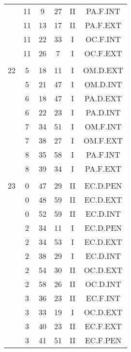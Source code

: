 \documentclass[12pt, a4paper]{article}
\begin{document}
\begin{multicols}{3}
{\begin{tabular}{c c c c c c}
	 	 	 	 & 11 & 9 & 27 & II & PA.F.INT\\%
	 	 	 	 & 11 & 13 & 17 & II & PA.F.EXT\\%
	 	 	 	 & 11 & 22 & 33 & I & OC.F.INT\\%
	 	 	 	 & 11 & 26 & 7 & I & OC.F.EXT\\%
	 	 	 	 & & & & & \\%
	 	 	 	22 & 5 & 18 & 11 & I & OM.D.EXT\\%
	 	 	 	 & 5 & 21 & 47 & I & OM.D.INT\\%
	 	 	 	 & 6 & 18 & 47 & I & PA.D.EXT\\%
	 	 	 	 & 6 & 22 & 23 & I & PA.D.INT\\%
	 	 	 	 & 7 & 34 & 51 & I & OM.F.INT\\%
	 	 	 	 & 7 & 38 & 27 & I & OM.F.EXT\\%
	 	 	 	 & 8 & 35 & 58 & I & PA.F.INT\\%
	 	 	 	 & 8 & 39 & 34 & I & PA.F.EXT\\%
	 	 	 	 & & & & & \\%
	 	 	 	23 & 0 & 47 & 29 & II & EC.D.PEN\\%
	 	 	 	 & 0 & 48 & 59 & II & EC.D.EXT\\%
	 	 	 	 & 0 & 52 & 59 & II & EC.D.INT\\%
	 	 	 	 & 2 & 34 & 11 & I & EC.D.PEN\\%
	 	 	 	 & 2 & 34 & 53 & I & EC.D.EXT\\%
	 	 	 	 & 2 & 38 & 29 & I & EC.D.INT\\%
	 	 	 	 & 2 & 54 & 30 & II & OC.D.EXT\\%
	 	 	 	 & 2 & 58 & 26 & II & OC.D.INT\\%
	 	 	 	 & 3 & 36 & 23 & II & EC.F.INT\\%
	 	 	 	 & 3 & 33 & 19 & I & OC.D.EXT\\%
	 	 	 	 & 3 & 40 & 23 & II & EC.F.EXT\\%
	 	 	 	 & 3 & 41 & 51 & II & EC.F.PEN\\%
	 	 \end{tabular}
 	}
\end{multicols}
\end{document}
